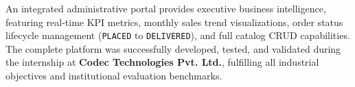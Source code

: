 \vspace{0.3cm}

\noindent An integrated administrative portal provides executive business intelligence, featuring real-time KPI metrics, monthly sales trend visualizations, order status lifecycle management (\texttt{PLACED} to \texttt{DELIVERED}), and full catalog CRUD capabilities. The complete platform was successfully developed, tested, and validated during the internship at \textbf{Codec Technologies Pvt. Ltd.}, fulfilling all industrial objectives and institutional evaluation benchmarks.

